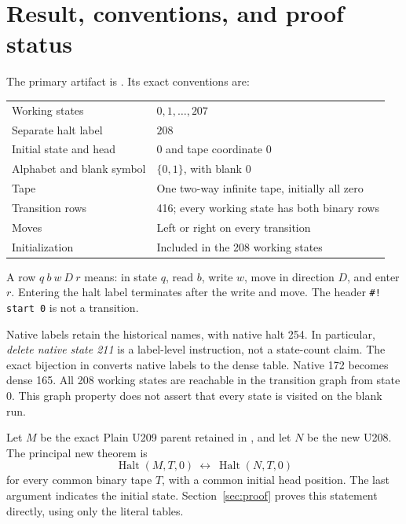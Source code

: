 \documentclass[11pt,letterpaper]{article}
\newcommand{\Halt}{\operatorname{Halt}}
\newcommand{\code}[1]{\texttt{#1}}
\begin{document}
\newpage
\begingroup\small\setlength{\parskip}{0pt}
\tableofcontents
\endgroup
\newpage
\section{Result, conventions, and proof status}

The primary artifact is . Its exact conventions are:
\begin{center}
\begin{tabular}{@{}ll@{}}
\toprule
Working states & $0,1,\ldots,207$\\
Separate halt label & $208$\\
Initial state and head & $0$ and tape coordinate $0$\\
Alphabet and blank symbol & $\{0,1\}$, with blank $0$\\
Tape & One two-way infinite tape, initially all zero\\
Transition rows & 416; every working state has both binary rows\\
Moves & Left or right on every transition\\
Initialization & Included in the 208 working states\\
\bottomrule
\end{tabular}
\end{center}
A row $q\ b\ w\ D\ r$ means: in state $q$, read $b$, write $w$,
move in direction $D$, and enter $r$. Entering the halt label terminates
after the write and move. The header \code{\#! start 0} is not a transition.

Native labels retain the historical names, with native halt 254. In particular,
\emph{delete native state 211} is a label-level instruction, not a state-count
claim. The exact bijection in  converts native
labels to the dense table. Native 172 becomes dense 165.
All 208 working states are reachable in the transition graph from state 0.
This graph property does not assert that every state is visited on the blank run.

Let $M$ be the exact Plain U209 parent retained in
, and let $N$ be the new U208.
The principal new theorem is
\[
 \Halt(M,T,0)\ \longleftrightarrow\ \Halt(N,T,0)
\]
for every common binary tape $T$, with a common initial head position.
The last argument indicates the initial state. Section~\ref{sec:proof}
proves this statement directly, using only the literal tables.
\end{document}

